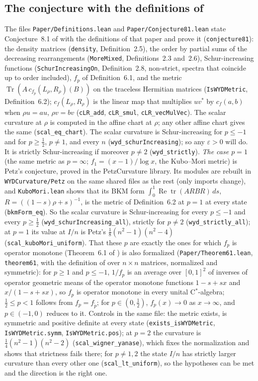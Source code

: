 \documentclass[11pt]{amsart}
\theoremstyle{definition}
\numberwithin{equation}{section}
\begin{document}
\subsection*{The conjecture with the definitions of \texorpdfstring{\cite{gi}}{the paper}} The files \texttt{Paper/Definitions.lean} and \texttt{Paper/Conjecture81.lean} state Conjecture~8.1 of \cite{gi} with the definitions of that paper and prove it (\texttt{conjecture81}): the density matrices (\texttt{density}, Definition~2.5),
the order by partial sums of the decreasing rearrangements (\texttt{MoreMixed}, Definitions~2.3 and~2.6), Schur-increasing functions (\texttt{SchurIncreasingOn}, Definition~2.8, non-strict, spectra that coincide up to order included), $f_p$ of Definition~6.1, and the metric
$\operatorname{Tr}(A\,c_{f_p}(L_\rho,R_\rho)(B))$ on the traceless Hermitian matrices (\texttt{IsWYDMetric}, Definition~6.2); $c_{f}(L_\rho,R_\rho)$ is the linear map that multiplies $uv^*$ by $c_f(a,b)$ when $\rho u=au$, $\rho v=bv$ (\texttt{cLR\_add}, \texttt{cLR\_smul}, \texttt{cLR\_vecMulVec}).
The scalar curvature at $\rho$ is computed in the affine chart at $\rho$; any other affine chart gives the same (\texttt{scal\_eq\_chart}). The scalar curvature is Schur-increasing for $p\le-1$ and for $p\ge\frac12$, $p\ne1$, and every $n$ (\texttt{wyd\_schurIncreasing}); so any $\varepsilon>0$ will do. It is strictly Schur-increasing if moreover $p\ne2$ (\texttt{wyd\_strictly}).
\emph{The case $p=1$} (the same metric as $p=\infty$; $f_1=(x-1)/\log x$, the Kubo--Mori metric) is Petz's conjecture, proved in the PetzCurvature library. Its modules are rebuilt in \texttt{WYDCurvature/Petz} on the same shared files as the rest (only imports change), and \texttt{KuboMori.lean} shows that its BKM form $\int_0^1\operatorname{Re}\operatorname{tr}(A R B R)\,ds$, $R=((1-s)\rho+s)^{-1}$, is the metric of Definition~6.2 at $p=1$ at every state (\texttt{bkmForm\_eq}). So the scalar curvature is Schur-increasing for every $p\le-1$ and every $p\ge\frac12$ (\texttt{wyd\_schurIncreasing\_all}), strictly for $p\ne2$ (\texttt{wyd\_strictly\_all}); at $p=1$ its value at $I/n$ is Petz's $\frac18(n^2-1)(n^2-4)$ (\texttt{scal\_kuboMori\_uniform}). That these $p$ are exactly the ones for which $f_p$ is operator monotone (Theorem~6.1 of \cite{gi}) is also formalized (\texttt{Paper/Theorem61.lean}, \texttt{theorem61}, with the definition of \cite{gi} over $n\times n$ matrices, normalized and symmetric): for $p\ge1$ and $p\le-1$, $1/f_p$ is an average over $[0,1]^2$ of inverses of operator geometric means of the operator monotone functions $1-s+sx$ and $x/(1-s+sx)$, so $f_p$ is operator monotone in every unital C$^*$-algebra; $\frac12\le p<1$ follows from $f_p=f_{\tilde p}$; for $p\in(0,\frac12)$, $f_p(x)\to0$ as $x\to\infty$, and $p\in(-1,0)$ reduces to it. Controls in the same file: the metric exists, is symmetric and positive definite at every state (\texttt{exists\_isWYDMetric}, \texttt{IsWYDMetric.symm}, \texttt{IsWYDMetric.pos});
at $p=2$ the curvature is $\frac14(n^2-1)(n^2-2)$ (\texttt{scal\_wigner\_yanase}), which fixes the normalization and shows that strictness fails there; for $p\ne1,2$ the state $I/n$ has strictly larger curvature than every other one (\texttt{scal\_lt\_uniform}), so the hypotheses can be met and the direction is the right one.
\end{document}
